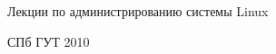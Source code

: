 \begin{titlepage}
\newpage

\begin{center}
\Large Лекции по администрированию системы Linux
\end{center}

\begin{center}
СПб ГУТ 2010
\end{center}

\end{titlepage}
